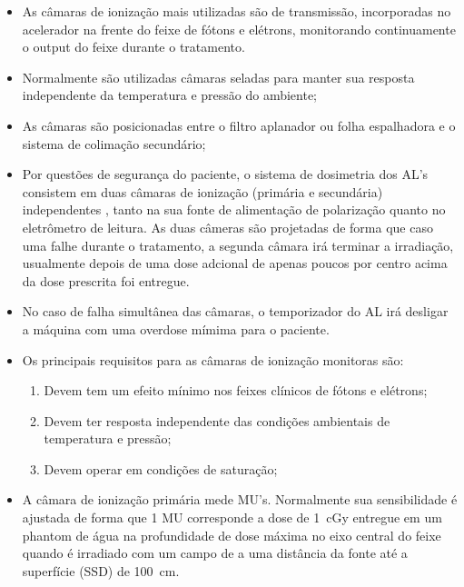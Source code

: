 \documentclass[11pt,a4paper]{article}
\begin{document}
	\begin{itemize}
		\item As câmaras de ionização mais utilizadas são de transmissão, incorporadas no acelerador na frente do feixe de fótons e elétrons, monitorando continuamente o output do feixe durante o tratamento.
		
		\item Normalmente são utilizadas câmaras seladas para manter sua resposta independente da temperatura e pressão do ambiente;
		
		\item As câmaras são posicionadas entre o filtro aplanador ou folha espalhadora e o sistema de colimação secundário;
		
		\item Por questões de segurança do paciente, o sistema de dosimetria dos AL's consistem em duas câmaras de ionização (primária e secundária) independentes , tanto na sua fonte de alimentação de polarização quanto no eletrômetro de leitura. As duas câmeras são projetadas de forma que caso uma falhe durante o tratamento, a segunda câmara irá terminar a irradiação, usualmente depois de uma dose adcional de apenas poucos por centro acima da dose prescrita foi entregue.
		
		\item No caso de falha simultânea das câmaras, o temporizador do AL irá desligar a máquina com uma overdose mímima para o paciente.
		
		\item Os principais requisitos para as câmaras de ionização monitoras são:
		
			\begin{enumerate}
				\item Devem tem um efeito mínimo nos feixes clínicos de fótons e elétrons;
				\item Devem ter resposta independente das condições ambientais de temperatura e pressão;
				\item Devem operar em condições de saturação;
			\end{enumerate}
		
		\item A câmara de ionização primária mede MU's. Normalmente sua sensibilidade é ajustada de forma que 1 MU corresponde a dose de \qty{1}{cGy} entregue em um phantom de água na profundidade de dose máxima no eixo central do feixe quando é irradiado com um campo de  a uma distância da fonte até a superfície (SSD) de \qty{100}{cm}.
		

\end{itemize}
\end{document}
